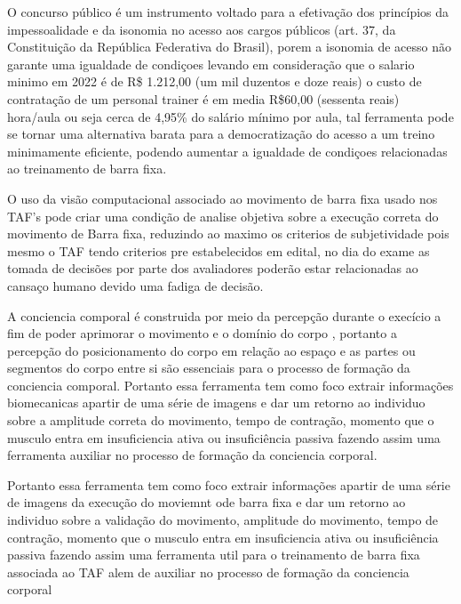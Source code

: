 O concurso público é um instrumento voltado para a efetivação dos princípios da impessoalidade e da isonomia no acesso aos cargos públicos \cite{} (art. 37, da Constituição da República Federativa do Brasil), porem a isonomia de acesso não garante uma igualdade de condiçoes levando em consideração que o salario minimo em 2022 é de R\$ 1.212,00 (um mil duzentos e doze reais) \cite{salarioMin} o custo de contratação de um personal trainer é em media R\$60,00 (sessenta reais) hora/aula \cite{valorPersonal} ou seja cerca de 4,95\% do salário mínimo por aula, tal ferramenta pode se tornar uma alternativa barata para a democratização do acesso a um treino minimamente eficiente, podendo aumentar a  igualdade de condiçoes relacionadas ao treinamento de barra fixa.


O uso da visão computacional associado ao movimento de barra fixa usado nos TAF's pode criar uma condição de analise objetiva sobre a execução correta do movimento de Barra fixa, reduzindo ao maximo os criterios de subjetividade pois mesmo o TAF tendo criterios pre estabelecidos em edital, no dia do exame as tomada de decisões por parte dos avaliadores poderão estar relacionadas ao cansaço humano devido uma fadiga de decisão\cite{fadiga}.


A conciencia comporal é construida por meio da percepção durante o execício a fim de poder aprimorar o movimento e o domínio do corpo \cite{consciencia}, portanto a percepção do posicionamento do corpo em relação ao espaço e as partes ou segmentos do corpo entre si são essenciais para o processo de formação da conciencia comporal. Portanto essa ferramenta tem como foco extrair informações biomecanicas apartir de uma série de imagens e dar um retorno ao individuo sobre a amplitude correta do movimento, tempo de contração, momento que o musculo entra em insuficiencia ativa ou insuficiência passiva fazendo assim uma ferramenta auxiliar no processo de formação da conciencia corporal.


Portanto essa ferramenta tem como foco extrair informações apartir de uma série de imagens da execução do moviemnt ode barra fixa e dar um retorno ao individuo sobre a validação do movimento, amplitude do movimento, tempo de contração, momento que o musculo entra em insuficiencia ativa ou insuficiência passiva fazendo assim uma ferramenta util para o treinamento de barra fixa associada ao TAF alem de auxiliar no processo de formação da conciencia corporal 




